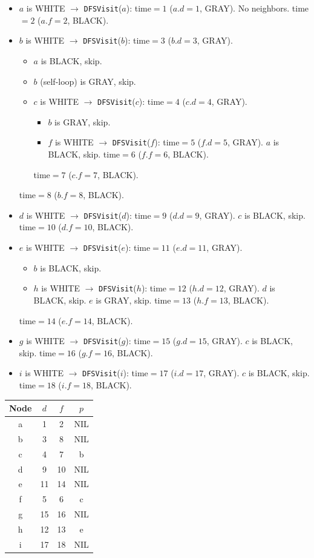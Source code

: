 \documentclass[addpoints]{exam}
\begin{document}
\begin{questions}
\begin{parts}
\begin{itemize}
  \item $a$ is WHITE $\to$ \texttt{DFSVisit}($a$): time$=1$ ($a.d=1$, GRAY). No neighbors. time$=2$ ($a.f=2$, BLACK).
  \item $b$ is WHITE $\to$ \texttt{DFSVisit}($b$): time$=3$ ($b.d=3$, GRAY).
    \begin{itemize}
      \item $a$ is BLACK, skip.
      \item $b$ (self-loop) is GRAY, skip.
      \item $c$ is WHITE $\to$ \texttt{DFSVisit}($c$): time$=4$ ($c.d=4$, GRAY).
        \begin{itemize}
          \item $b$ is GRAY, skip.
          \item $f$ is WHITE $\to$ \texttt{DFSVisit}($f$): time$=5$ ($f.d=5$, GRAY). $a$ is BLACK, skip. time$=6$ ($f.f=6$, BLACK).
        \end{itemize}
        time$=7$ ($c.f=7$, BLACK).
    \end{itemize}
    time$=8$ ($b.f=8$, BLACK).
  \item $d$ is WHITE $\to$ \texttt{DFSVisit}($d$): time$=9$ ($d.d=9$, GRAY). $c$ is BLACK, skip. time$=10$ ($d.f=10$, BLACK).
  \item $e$ is WHITE $\to$ \texttt{DFSVisit}($e$): time$=11$ ($e.d=11$, GRAY).
    \begin{itemize}
      \item $b$ is BLACK, skip.
      \item $h$ is WHITE $\to$ \texttt{DFSVisit}($h$): time$=12$ ($h.d=12$, GRAY). $d$ is BLACK, skip. $e$ is GRAY, skip. time$=13$ ($h.f=13$, BLACK).
    \end{itemize}
    time$=14$ ($e.f=14$, BLACK).
  \item $g$ is WHITE $\to$ \texttt{DFSVisit}($g$): time$=15$ ($g.d=15$, GRAY). $c$ is BLACK, skip. time$=16$ ($g.f=16$, BLACK).
  \item $i$ is WHITE $\to$ \texttt{DFSVisit}($i$): time$=17$ ($i.d=17$, GRAY). $c$ is BLACK, skip. time$=18$ ($i.f=18$, BLACK).
\end{itemize}

\begin{tabular}{c | c | c | c}
Node & $d$ & $f$ & $p$ \\
\hline
a & 1  & 2  & NIL \\
b & 3  & 8  & NIL \\
c & 4  & 7  & b \\
d & 9  & 10 & NIL \\
e & 11 & 14 & NIL \\
f & 5  & 6  & c \\
g & 15 & 16 & NIL \\
h & 12 & 13 & e \\
i & 17 & 18 & NIL \\
\end{tabular}


\end{parts}
\end{questions}
\end{document}
